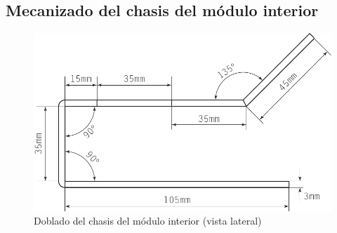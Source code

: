\vfill

\clearpage

\subsection{Mecanizado del chasis del módulo interior}

\vfill

\begin{figure}[H]
  \centering
  \includegraphics[width=0.8\columnwidth]{../design/interior-body-side}
  \caption{Doblado del chasis del módulo interior (vista lateral)}
  \label{fig:interior-body-side}
\end{figure}

\vfill

\clearpage

